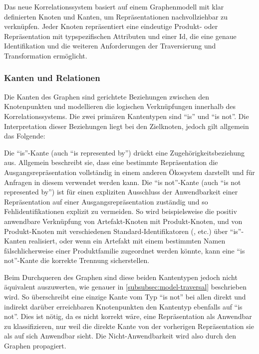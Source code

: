 Das neue Korrelationssystem basiert auf einem Graphenmodell mit klar definierten Knoten und Kanten, um Repräsentationen nachvollziehbar zu verknüpfen.
Jeder Knoten repräsentiert eine eindeutige Produkt- oder Repräsentation mit typspezifischen Attributen und einer Id, die eine genaue Identifikation und die weiteren Anforderungen der Traversierung und Transformation ermöglicht.

\subsubsection{Kanten und Relationen}\label{subsubsec:model-edges-relations}
Die Kanten des Graphen sind gerichtete Beziehungen zwischen den Knotenpunkten und modellieren die logischen Verknüpfungen innerhalb des Korrelationssystems.
Die zwei primären Kantentypen sind \enquote{is} und \enquote{is not}.
Die Interpretation dieser Beziehungen liegt bei den Zielknoten, jedoch gilt allgemein das Folgende:

Die \enquote{is}-Kante (auch \enquote{is represented by}) drückt eine Zugehörigkeitsbeziehung aus.
Allgemein beschreibt sie, dass eine bestimmte Repräsentation die Ausgangsrepräsentation vollständig in einem anderen Ökosystem darstellt und für Anfragen in diesem verwendet werden kann.
Die \enquote{is not}-Kante (auch \enquote{is not represented by}) ist für einen expliziten Ausschluss der Anwendbarkeit einer Repräsentation auf einer Ausgangsrepräsentation zuständig und so Fehlidentifikationen explizit zu vermeiden.
So wird beispielsweise die positiv anwendbare Verknüpfung von Artefakt-Knoten mit Produkt-Knoten, und von Produkt-Knoten mit verschiedenen Standard-Identifikatoren (,  etc.) über \enquote{is}-Kanten realisiert, oder wenn ein Artefakt mit einem bestimmten Namen fälschlicherweise einer Produktfamilie zugeordnet werden könnte, kann eine \enquote{is not}-Kante die korrekte Trennung sicherstellen.

Beim Durchqueren des Graphen sind diese beiden Kantentypen jedoch nicht äquivalent auszuwerten, wie genauer in \autoref{subsubsec:model-traversal} beschrieben wird.
So überschreibt eine einzige Kante vom Typ \enquote{is not} bei allen direkt und indirekt darüber erreichbaren Knotenpunkten den Kantentyp ebenfalls auf \enquote{is not}.
Dies ist nötig, da es nicht korrekt wäre, eine Repräsentation als Anwendbar zu klassifizieren, nur weil die direkte Kante von der vorherigen Repräsentation sie als auf sich Anwendbar sieht.
Die Nicht-Anwendbarkeit wird also durch den Graphen propagiert.

